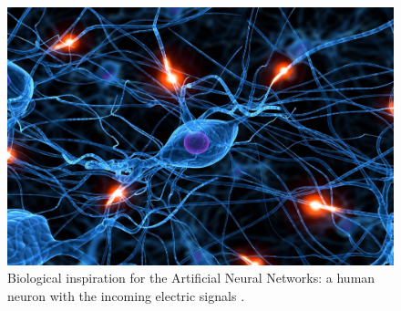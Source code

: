 \begin{figure}[!htb]
\centering
\includegraphics[width=.50\columnwidth]{images/048neuron0}
\caption[Biological inspiration]{Biological inspiration for the Artificial
Neural Networks: a human neuron with the incoming electric signals
\cite{RefWorks:158}.}
\label{fig:048neuron0}
\end{figure}